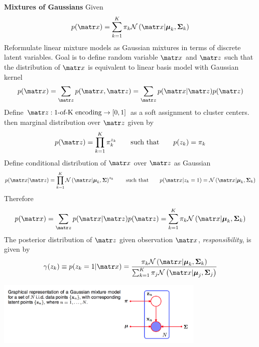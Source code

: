 \documentclass[11pt]{article}
\begin{document}
\begin{defn*}
    \textbf{Mixtures of Gaussians} Given 
    \[
        p(\bx) = \sum_{k=1}^K \pi_k \normal{\bx | \bmu_k, \boldsymbol{\Sigma}_k}    
    \]
    Reformulate linear mixture models as Gaussian mixtures in terms of discrete latent variables. Goal is to define random variable $\bx$ and $\bz$ such that the distribution of $\bx$ is equivalent to linear basis model with Gaussian kernel 
    \[
        p(\bx)
        = \sum_{\bz} p(\bx,\bz)
        = \sum_{\bz} p(\bx | \bz) p(\bz)
    \]
    Define $\bz: \text{1-of-K encoding} \rightarrow [0,1]$ as a soft assignment to cluster centers. then marginal distribution over $\bz$ given by 
    \[
        p(\bz) = \prod_{k=1}^K \pi_k^{z_k}
        \qquad \text{such that} \qquad 
        p(z_k) = \pi_k    
    \] 
    Define conditional distribution of $\bx$ over $\bz$ as Gaussian 
    \[
        p(\bx | \bz) = \prod_{k=1}^K \normal{\bx | \bmu_k, \bSigma}^{z_k}    
        \qquad \text{such that} \qquad 
        p(\bx | z_k = 1) = \normal{\bx | \bmu_k, \bSigma_k}
    \]
    Therefore 
    \[
        p(\bx) = \sum_{\bz} p(\bx | \bz) p(\bz)
        = \sum_{k=1}^K \pi_k \normal{\bx | \bmu_k, \boldsymbol{\Sigma}_k}   
    \]
    The posterior distribution of $\bz$ given observation $\bx$, \textit{responsibility}, is given by 
    \[
        \gamma(z_k)\equiv p(z_k=1|\bx)
        = \frac{\pi_k \normal{\bx | \bmu_k, \bSigma_k}}{\sum_{k=1}^K \pi_j \normal{\bx | \bmu_j, \bSigma_j}}
    \]
    \begin{center}
        \includegraphics[width=10cm]{gaussian_mixture_graphical_model.png}
    \end{center}
\end{defn*}
\end{document}
